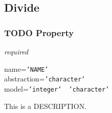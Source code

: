 %
%
%
%
%
%

\subsection{Divide}
\label{divide_heading}

\subsubsection{TODO Property}

\emph{required}

name=\texttt{'NAME'}\\
abstraction=\texttt{'character'}\\
model=\texttt{'integer' \vline\ 'character'}

This is a DESCRIPTION.
